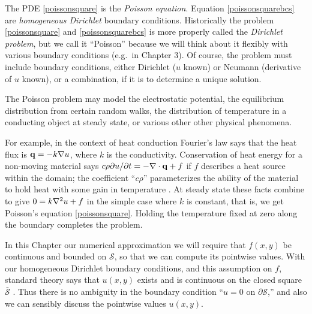 The PDE \eqref{poissonsquare} is the \emph{Poisson equation}.  Equation \eqref{poissonsquarebcs} are \emph{homogeneous Dirichlet} boundary conditions.  Historically the problem \eqref{poissonsquare} and \eqref{poissonsquarebcs} is more properly called the \emph{Dirichlet problem}, but we call it ``Poisson'' because we will think about it flexibly with various boundary conditions (e.g.~in Chapter 3).  Of course, the problem must include boundary conditions, either Dirichlet ($u$ known) or Neumann (derivative of $u$ known), or a combination, if it is to determine a unique solution.

The Poisson problem may model the electrostatic potential, the equilibrium distribution from certain random walks, the distribution of temperature in a conducting object at steady state, or various other other physical phenomena.

For example, in the context of heat conduction Fourier's law says that the heat flux is $\mathbf{q} = -k \nabla u$, where $k$ is the conductivity.  Conservation of heat energy for a non-moving material says $c\rho \partial u/\partial t = - \nabla\cdot\mathbf{q} + f$ if $f$ describes a heat source within the domain; the coefficient ``$c\rho$'' parameterizes the ability of the material to hold heat with some gain in temperature \citep{Ockendonetal2003}.  At steady state these facts combine to give $0 = k \nabla^2 u + f$ in the simple case where $k$ is constant, that is, we get Poisson's equation \eqref{poissonsquare}.  Holding the temperature fixed at zero along the boundary completes the problem.

In this Chapter our numerical approximation we will require that $f(x,y)$ be continuous and bounded on $\mathcal{S}$, so that we can compute its pointwise values.  With our homogeneous Dirichlet boundary conditions, and this assumption on $f$, standard theory says that $u(x,y)$ exists and is continuous on the closed square $\bar{\mathcal{S}}$ \citep[Theorem 6 in section 5.6]{Evans}.  Thus there is no ambiguity in the boundary condition ``$u=0$ on $\partial \mathcal{S}$,'' and also we can sensibly discuss the pointwise values $u(x,y)$.

